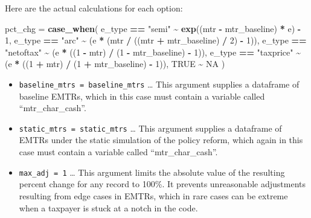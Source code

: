 \documentclass[
]{article}
\newenvironment{Shaded}{\begin{snugshade}}{\end{snugshade}}
\newcommand{\ConstantTok}[1]{\textcolor[rgb]{0.56,0.35,0.01}{#1}}
\newcommand{\DecValTok}[1]{\textcolor[rgb]{0.00,0.00,0.81}{#1}}
\newcommand{\FunctionTok}[1]{\textcolor[rgb]{0.13,0.29,0.53}{\textbf{#1}}}
\newcommand{\NormalTok}[1]{#1}
\newcommand{\OtherTok}[1]{\textcolor[rgb]{0.56,0.35,0.01}{#1}}
\newcommand{\SpecialCharTok}[1]{\textcolor[rgb]{0.81,0.36,0.00}{\textbf{#1}}}
\newcommand{\StringTok}[1]{\textcolor[rgb]{0.31,0.60,0.02}{#1}}
\begin{document}
Here are the actual calculations for each option:

\begin{Shaded}
\begin{Highlighting}[]
\NormalTok{      pct\_chg }\OtherTok{=} \FunctionTok{case\_when}\NormalTok{(}
\NormalTok{        e\_type }\SpecialCharTok{==} \StringTok{"semi"}     \SpecialCharTok{\textasciitilde{}} \FunctionTok{exp}\NormalTok{((mtr }\SpecialCharTok{{-}}\NormalTok{ mtr\_baseline) }\SpecialCharTok{*}\NormalTok{ e) }\SpecialCharTok{{-}} \DecValTok{1}\NormalTok{,}
\NormalTok{        e\_type }\SpecialCharTok{==} \StringTok{"arc"}      \SpecialCharTok{\textasciitilde{}}\NormalTok{ (e }\SpecialCharTok{*}\NormalTok{ (mtr }\SpecialCharTok{/}\NormalTok{ ((mtr }\SpecialCharTok{+}\NormalTok{ mtr\_baseline) }\SpecialCharTok{/} \DecValTok{2}\NormalTok{) }\SpecialCharTok{{-}} \DecValTok{1}\NormalTok{)),}
\NormalTok{        e\_type }\SpecialCharTok{==} \StringTok{"netoftax"} \SpecialCharTok{\textasciitilde{}}\NormalTok{ (e }\SpecialCharTok{*}\NormalTok{ ((}\DecValTok{1} \SpecialCharTok{{-}}\NormalTok{ mtr) }\SpecialCharTok{/}\NormalTok{ (}\DecValTok{1} \SpecialCharTok{{-}}\NormalTok{ mtr\_baseline) }\SpecialCharTok{{-}} \DecValTok{1}\NormalTok{)),}
\NormalTok{        e\_type }\SpecialCharTok{==} \StringTok{"taxprice"} \SpecialCharTok{\textasciitilde{}}\NormalTok{ (e }\SpecialCharTok{*}\NormalTok{ ((}\DecValTok{1} \SpecialCharTok{+}\NormalTok{ mtr) }\SpecialCharTok{/}\NormalTok{ (}\DecValTok{1} \SpecialCharTok{+}\NormalTok{ mtr\_baseline) }\SpecialCharTok{{-}} \DecValTok{1}\NormalTok{)),}
        \ConstantTok{TRUE}                 \SpecialCharTok{\textasciitilde{}} \ConstantTok{NA} 
\NormalTok{      ) }
\end{Highlighting}
\end{Shaded}

\begin{itemize}
\item
  \texttt{baseline\_mtrs\ =\ baseline\_mtrs} \ldots{} This argument
  supplies a dataframe of baseline EMTRs, which in this case must
  contain a variable called ``mtr\_char\_cash''.
\item
  \texttt{static\_mtrs\ =\ static\_mtrs} \ldots{} This argument supplies
  a dataframe of EMTRs under the static simulation of the policy reform,
  which again in this case must contain a variable called
  ``mtr\_char\_cash''.
\item
  \texttt{max\_adj\ =\ 1} \ldots{} This argument limits the absolute
  value of the resulting percent change for any record to 100\%. It
  prevents unreasonable adjustments resulting from edge cases in EMTRs,
  which in rare cases can be extreme when a taxpayer is stuck at a notch
  in the code.
\end{itemize}
\end{document}
